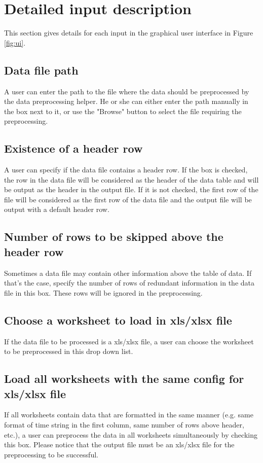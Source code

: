 \documentclass[12pt,a4paper]{article}
\begin{document}
\section{Detailed input description}
This section gives details for each input in the graphical user interface in Figure \ref{fig:ui}.

\subsection{Data file path}
A user can enter the path to the file where the data should be preprocessed by the data preprocessing helper.
He or she can either enter the path manually in the box next to it, or use the "Browse" button to select the file requiring the preprocessing.

\subsection{Existence of a header row}
A user can specify if the data file contains a header row.
If the box is checked, the row in the data file will be considered as the header of the data table and will be output as the header in the output file.
If it is not checked, the first row of the file will be considered as the first row of the data file and the output file will be output with a default header row.

\subsection{Number of rows to be skipped above the header row}
Sometimes a data file may contain other information above the table of data.
If that's the case, specify the number of rows of redundant information in the data file in this box.
These rows will be ignored in the preprocessing.

\subsection{Choose a worksheet to load in xls/xlsx file}
If the data file to be processed is a xls/xlsx file, a user can choose the worksheet to be preprocessed in this drop down list.

\subsection{Load all worksheets with the same config for xls/xlsx file}
If all worksheets contain data that are formatted in the same manner (e.g. same format of time string in the first column, same number of rows above header, etc.), a user can preprocess the data in all worksheets simultaneously by checking this box.
Please notice that the output file must be an xls/xlsx file for the preprocessing to be successful.
\end{document}
